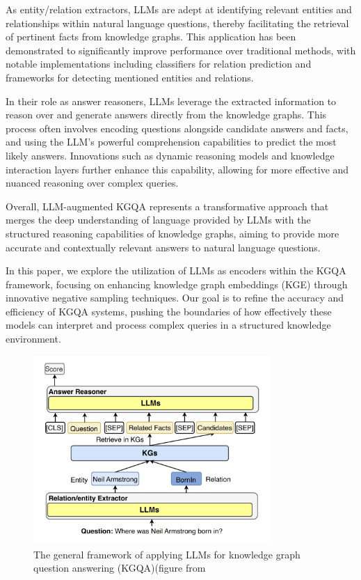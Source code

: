 \documentclass[12pt]{article}
\begin{document}
As entity/relation extractors, LLMs are adept at identifying relevant entities and relationships within natural language questions, thereby facilitating the retrieval of pertinent facts from knowledge graphs. This application has been demonstrated to significantly improve performance over traditional methods, with notable implementations including classifiers for relation prediction and frameworks for detecting mentioned entities and relations.

In their role as answer reasoners, LLMs leverage the extracted information to reason over and generate answers directly from the knowledge graphs. This process often involves encoding questions alongside candidate answers and facts, and using the LLM's powerful comprehension capabilities to predict the most likely answers. Innovations such as dynamic reasoning models and knowledge interaction layers further enhance this capability, allowing for more effective and nuanced reasoning over complex queries.

Overall, LLM-augmented KGQA represents a transformative approach that merges the deep understanding of language provided by LLMs with the structured reasoning capabilities of knowledge graphs, aiming to provide more accurate and contextually relevant answers to natural language questions.

In this paper, we explore the utilization of LLMs as encoders within the KGQA framework, focusing on enhancing knowledge graph embeddings (KGE) through innovative negative sampling techniques. Our goal is to refine the accuracy and efficiency of KGQA systems, pushing the boundaries of how effectively these models can interpret and process complex queries in a structured knowledge environment.

\begin{figure}[!ht] %
  \centering %
  \includegraphics[width=0.8\textwidth]{introduction_img.png} %
  \caption{The general framework of applying LLMs for knowledge graph
question answering (KGQA)(figure from \textcite{Pan2023UnifyingLL}
} %
  \label{fig:introduction_img} %
\end{figure}
\end{document}
